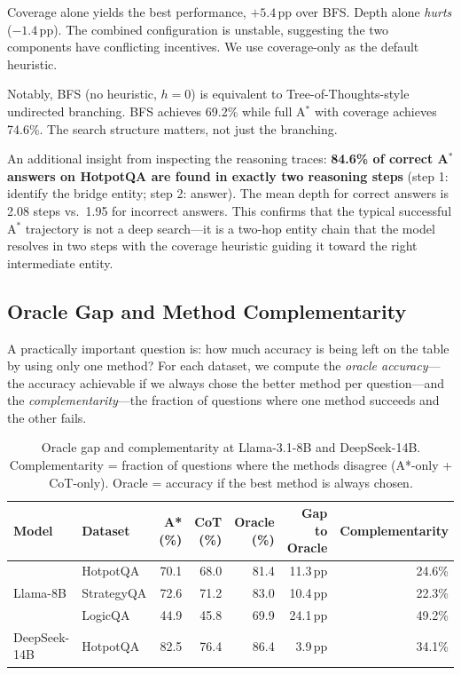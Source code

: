 \documentclass{article}
\newcommand{\astar}{A$^*$\xspace}
\begin{document}
Coverage alone yields the best performance, $+5.4$\,pp over BFS. Depth alone \emph{hurts} ($-1.4$\,pp). The combined configuration is unstable, suggesting the two components have conflicting incentives. We use coverage-only as the default heuristic.

Notably, BFS (no heuristic, $h=0$) is equivalent to Tree-of-Thoughts-style undirected branching. BFS achieves 69.2\% while full \astar with coverage achieves 74.6\%. The search structure matters, not just the branching.

An additional insight from inspecting the reasoning traces: \textbf{84.6\% of correct \astar answers on HotpotQA are found in exactly two reasoning steps} (step 1: identify the bridge entity; step 2: answer). The mean depth for correct answers is 2.08 steps vs.\ 1.95 for incorrect answers. This confirms that the typical successful \astar trajectory is not a deep search---it is a two-hop entity chain that the model resolves in two steps with the coverage heuristic guiding it toward the right intermediate entity.

\subsection{Oracle Gap and Method Complementarity}
\label{sec:oracle}

A practically important question is: how much accuracy is being left on the table by using only one method? For each dataset, we compute the \emph{oracle accuracy}---the accuracy achievable if we always chose the better method per question---and the \emph{complementarity}---the fraction of questions where one method succeeds and the other fails.

\begin{table}[h]
\centering
\caption{Oracle gap and complementarity at Llama-3.1-8B and DeepSeek-14B. Complementarity = fraction of questions where the methods disagree (A*-only + CoT-only). Oracle = accuracy if the best method is always chosen.}
\label{tab:oracle}
\small
\begin{tabular}{llrrrrr}
\toprule
Model & Dataset & A* (\%) & CoT (\%) & Oracle (\%) & Gap to Oracle & Complementarity \\
\midrule
\multirow{3}{*}{Llama-8B}
  & HotpotQA   & 70.1 & 68.0 & 81.4 & 11.3\,pp & 24.6\% \\
  & StrategyQA & 72.6 & 71.2 & 83.0 & 10.4\,pp & 22.3\% \\
  & LogicQA    & 44.9 & 45.8 & 69.9 & 24.1\,pp & 49.2\% \\
\midrule
DeepSeek-14B & HotpotQA & 82.5 & 76.4 & 86.4 & 3.9\,pp & 34.1\% \\
\bottomrule
\end{tabular}
\end{table}
\end{document}
